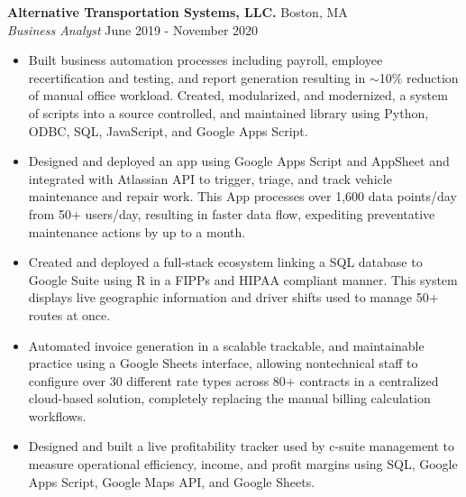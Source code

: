 \documentclass[a4paper]{article}
\begin{document}
\textbf{Alternative Transportation Systems, LLC.} \hfill Boston, MA\\
\textit{Business Analyst} \hfill June 2019 - November 2020\\
\vspace{-1mm}
\begin{itemize} \itemsep 1pt
	\item Built business automation processes including payroll, employee recertification and testing, and report generation resulting in $\sim$10\% reduction of manual office workload. 
    Created, modularized, and modernized, a system of scripts into a source controlled, and maintained library using Python, ODBC, SQL, JavaScript, and Google Apps Script.
	\item Designed and deployed an app using Google Apps Script and AppSheet and integrated with Atlassian API to trigger, triage, and track vehicle maintenance and repair work. This App processes over 1,600 data points/day from 50+ users/day, resulting in faster data flow, expediting preventative maintenance actions by up to a month.
	\item Created and deployed a full-stack ecosystem linking a SQL database to Google Suite using R in a FIPPs and HIPAA compliant manner. This system displays live geographic information and driver shifts used to manage 50+ routes at once.
	\item Automated invoice generation in a scalable trackable, and maintainable practice using a Google Sheets interface, allowing nontechnical staff to configure over 30 different rate types across 80+ contracts in a centralized cloud-based solution, completely replacing the manual billing calculation workflows.
	\item Designed and built a live profitability tracker used by c-suite management to measure operational efficiency, income, and profit margins using SQL, Google Apps Script, Google Maps API, and Google Sheets.
\end{itemize}
\end{document}

